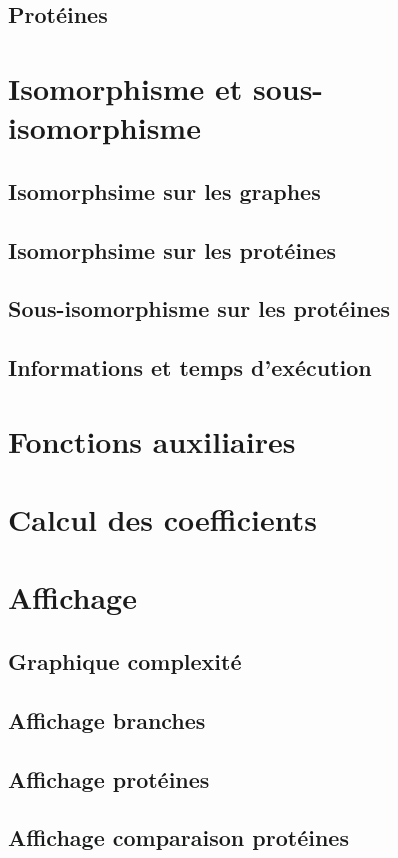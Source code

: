 \documentclass[a4paper, french, twoside]{article}
\begin{document}
\subsection{Protéines}


\section{Isomorphisme et sous-isomorphisme}

\subsection{Isomorphsime sur les graphes}

\subsection{Isomorphsime sur les protéines}

\subsection{Sous-isomorphisme sur les protéines}

\subsection{Informations et temps d'exécution}



\section{Fonctions auxiliaires}


\section{Calcul des coefficients}



\section{Affichage}
\subsection{Graphique complexité}

\subsection{Affichage branches}

\subsection{Affichage protéines}

\subsection{Affichage comparaison protéines}

\end{document}
